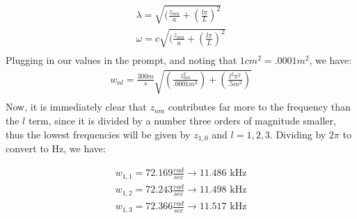 \documentclass{article}
\begin{document}
\begin{equation}
\begin{aligned}
\lambda = \sqrt{(\frac{z_{mn}}{a} + (\frac{l\pi}{L})^2}\\
\omega = c\sqrt{(\frac{z_{mn}}{a} + (\frac{l\pi}{L})^2}\\
\end{aligned}
\end{equation}
Plugging in our values in the prompt, and noting that $1cm^2 = .0001m^2$, we have:
\begin{equation}
\begin{aligned}
w_{nl} = \frac{300m}{s}\sqrt{(\frac{z_{mn}^2}{.0001m^2}) + (\frac{l^2\pi^2}{.5m^2})}\\
\end{aligned}
\end{equation}
Now, it is immediately clear that $z_{nm}$ contributes far more to the frequency than the $l$ term, since it is divided by a number three orders of magnitude smaller, thus the lowest frequencies will be given by $z_{1,0}$ and $l=1,2,3$. Dividing by $2\pi$ to convert to Hz, we have:
\begin{tcolorbox}[minipage,colback=white,arc=0pt,outer arc=0pt]
\begin{equation}
\begin{aligned}
w_{1,1} = 72.169\frac{rad}{sec} \to 11.486 \text{ kHz}\\
w_{1,2} = 72.243\frac{rad}{sec} \to 11.498 \text{ kHz}\\
w_{1,3} = 72.366\frac{rad}{sec} \to 11.517 \text{ kHz}\\
\end{aligned}
\end{equation}
\end{tcolorbox}
\end{document}
